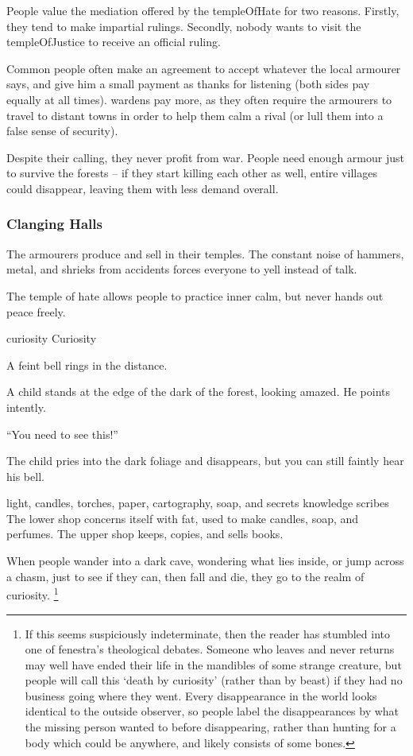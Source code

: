 \begin{multicols}{2}
\noindent
People value the mediation offered by the \gls{templeOfHate} for two reasons.
Firstly, they tend to make impartial rulings.
Secondly, nobody wants to visit the \gls{templeOfJustice} to receive an official ruling.

Common people often make an agreement to accept whatever the local armourer says, and give him a small payment as thanks for listening (both sides pay equally at all times).
\Glspl{warden} pay more, as they often require the armourers to travel to distant towns in order to help them calm a rival (or lull them into a false sense of security).

Despite their calling, they never profit from war.
People need enough armour just to survive the forests -- if they start killing each other as well, entire \glspl{village} could disappear, leaving them with less demand overall.

\subsubsection{Clanging Halls}
The armourers produce and sell in their temples.
The constant noise of hammers, metal, and shrieks from accidents forces everyone to yell instead of talk.

The temple of hate allows people to practice inner calm, but never hands out peace freely.


  {\gls{curiosity}}%
  {Curiosity}%
  {
    A feint bell rings in the distance.

    A child stands at the edge of the dark of the forest, looking amazed.
    He points intently.

    {\sffamily``You need to see this!''}

    The child pries into the dark foliage and disappears, but you can still faintly hear his bell.
  }%
  {light, candles, torches, paper, cartography, soap, and secrets}%
  {knowledge}%
  {\Glspl{scribe}}%
  {
    The lower shop concerns itself with fat, used to make candles, soap, and perfumes.
    The upper shop keeps, copies, and sells books.
  }%

When people wander into a dark cave, wondering what lies inside, or jump across a chasm, just to see if they can, then fall and die, they go to the realm of curiosity.%
\footnote{If this seems suspiciously indeterminate, then the reader has stumbled into one of \gls{fenestra}'s theological debates.
Someone who leaves and never returns may well have ended their life in the mandibles of some strange creature, but people will call this `death by curiosity' (rather than by beast) if they had no business going where they went.
Every disappearance in the world looks identical to the outside observer, so people label the disappearances by what the missing person wanted to before disappearing, rather than hunting for a body which could be anywhere, and likely consists of some bones.

}
\end{multicols}
